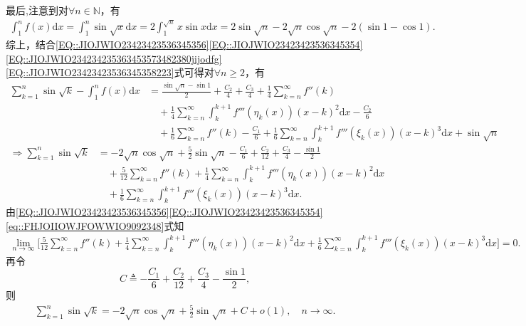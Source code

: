 \documentclass[../../main.tex]{subfiles}%
\begin{document}
\begin{solution}
最后,注意到对$\forall n\in \mathbb{N}$，有
\begin{align}
\int_1^n f(x) \mathrm{d}x
= \int_1^n \sin \sqrt{x} \mathrm{d}x
= 2\int_1^{\sqrt{n}} x\sin x \mathrm{d}x
= 2\sin \sqrt{n} - 2\sqrt{n}\cos \sqrt{n} - 2(\sin 1 - \cos 1).\label{EQ::JIOJWIO23423423536345358223}
\end{align}
综上，结合\eqref{EQ::JIOJWIO23423423536345356}\eqref{EQ::JIOJWIO23423423536345354}\eqref{EQ::JIOJWIO234234235363453573482380jijodfg}\eqref{EQ::JIOJWIO23423423536345358223}式可得对$\forall n\geqslant 2$，有
\begin{align*}
\sum\limits_{k=1}^n \sin \sqrt{k} - \int_1^n f(x) \mathrm{d}x
&= \frac{\sin \sqrt{n} - \sin 1}{2} + \frac{C_2}{4} + \frac{C_3}{4} + \frac{1}{4}\sum\limits_{k=n}^{\infty} f''(k) \\
&\quad + \frac{1}{4}\sum\limits_{k=n}^{\infty} \int_k^{k+1} f'''(\eta_k(x))(x-k)^2 \mathrm{d}x - \frac{C_2}{6} \\
&\quad + \frac{1}{6}\sum\limits_{k=n}^{\infty} f''(k) - \frac{C_1}{6} + \frac{1}{6}\sum\limits_{k=n}^{\infty} \int_k^{k+1} f'''(\xi_k(x))(x-k)^3 \mathrm{d}x + \sin \sqrt{n}
\end{align*}
\begin{align*}
\Longrightarrow \sum\limits_{k=1}^n \sin \sqrt{k}
&= -2\sqrt{n}\cos \sqrt{n} + \frac{5}{2}\sin \sqrt{n} - \frac{C_1}{6} + \frac{C_2}{12} + \frac{C_3}{4} - \frac{\sin 1}{2} \\
&\quad + \frac{5}{12}\sum\limits_{k=n}^{\infty} f''(k) + \frac{1}{4}\sum\limits_{k=n}^{\infty} \int_k^{k+1} f'''(\eta_k(x))(x-k)^2 \mathrm{d}x \\
&\quad + \frac{1}{6}\sum\limits_{k=n}^{\infty} \int_k^{k+1} f'''(\xi_k(x))(x-k)^3 \mathrm{d}x.
\end{align*}
由\eqref{EQ::JIOJWIO23423423536345356}\eqref{EQ::JIOJWIO23423423536345354}\eqref{eq::FHJOIIOWJFOWWIO9092348}式知
\begin{align*}
\lim\limits_{n\rightarrow \infty} \Bigg[
\frac{5}{12}\sum\limits_{k=n}^{\infty} f''(k)
+ \frac{1}{4}\sum\limits_{k=n}^{\infty} \int_k^{k+1} f'''(\eta_k(x))(x-k)^2 \mathrm{d}x
+ \frac{1}{6}\sum\limits_{k=n}^{\infty} \int_k^{k+1} f'''(\xi_k(x))(x-k)^3 \mathrm{d}x
\Bigg] = 0.
\end{align*}
再令$$C \triangleq -\frac{C_1}{6} + \frac{C_2}{12} + \frac{C_3}{4} - \frac{\sin 1}{2},$$则
\begin{align*}
\sum\limits_{k=1}^n \sin \sqrt{k} = -2\sqrt{n}\cos \sqrt{n} + \frac{5}{2}\sin \sqrt{n} + C + o(1),\quad n\rightarrow \infty.
\end{align*}

\end{solution}
\end{document}
